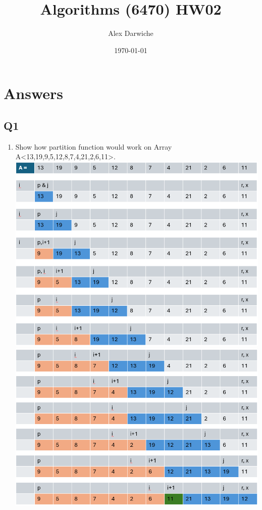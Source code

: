 \documentclass{article}
\title{Algorithms (6470) HW02}
\author{Alex Darwiche}
\date{\today}
\begin{document}
\maketitle

\section*{Answers}

\subsection*{Q1}
\begin{enumerate}[label=(\alph*)]
    \item Show how partition function would work on Array A<13,19,9,5,12,8,7,4,21,2,6,11>.
    \subitem \includegraphics[width=1\textwidth]{partition1.png}
    \subitem \includegraphics[width=1\textwidth]{partition2.png}
\end{enumerate}
\end{document}
